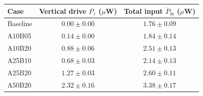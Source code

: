 \begin{tabular*}{\linewidth}{@{\extracolsep{\fill}}lcc@{}}\toprule
Case & Vertical drive $P_z$ ($\mu$W) & Total input $\overline{P}_{\mathrm{in}}$ ($\mu$W)\\\midrule
Baseline & $0.00 \pm 0.00$ & $1.76 \pm 0.09$ \\
A10B05 & $0.14 \pm 0.00$ & $1.84 \pm 0.14$ \\
A10B20 & $0.88 \pm 0.06$ & $2.51 \pm 0.13$ \\
A25B10 & $0.68 \pm 0.03$ & $2.14 \pm 0.13$ \\
A25B20 & $1.27 \pm 0.03$ & $2.60 \pm 0.11$ \\
A50B20 & $2.32 \pm 0.16$ & $3.38 \pm 0.17$ \\
\bottomrule
\end{tabular*}

